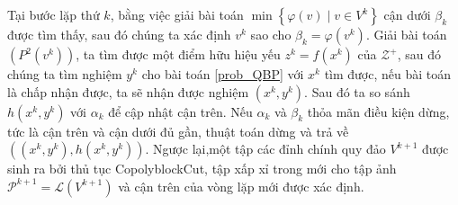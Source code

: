 Tại bước lặp thứ $k$, bằng việc giải bài toán $\min\left\{ \varphi\left(v\right)\mid v\in V^{k}\right\} $
cận dưới $\beta_{k}$ được tìm thấy, sau đó chúng ta xác định $v^{k}$
sao cho $\beta_{k}=\varphi\left(v^{k}\right)$. Giải bài toán $\left(P^{2}\left(v^{k}\right)\right)$,
ta tìm được một điểm hữu hiệu yếu $z^{k}=f\left(x^{k}\right)$
của $\mathcal{Z}^+$, sau đó chúng ta tìm nghiệm $y^k$ cho bài toán \ref{prob_QBP} với $x^k$ tìm được, nếu bài toán là chấp nhận được, ta sẽ nhận được nghiệm $\left(x^{k},y^{k}\right)$.
Sau đó ta so sánh $h\left(x^{k},y^{k}\right)$ với
$\alpha_{k}$ để cập nhật cận trên. Nếu $\alpha_{k}$ và $\beta_{k}$
thỏa mãn điều kiện dừng, tức là cận trên và cận dưới đủ gần, thuật toán dừng và trả về $\left(\left(x^{k},y^{k}\right),h\left(x^{k},y^{k}\right)\right)$. Ngược lại,một tập các đỉnh chính quy đảo $V^{k+1}$ được sinh ra bởi thủ tục CopolyblockCut, tập xấp xỉ trong mới cho tập ảnh $\mathcal{P}^{k+1}=\mathcal{L}\left(V^{k+1}\right)$ và cận trên của vòng lặp mới được xác định.




